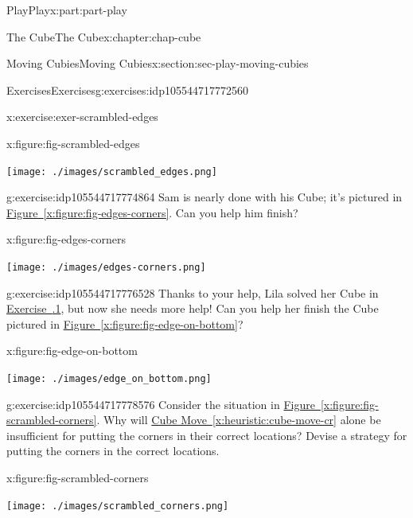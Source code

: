 \documentclass[oneside,10pt,]{book}
\newcommand{\xreffont}{\relax}
\numberwithin{equation}{section}
\begin{document}
\begin{partptx}{Play}{}{Play}{}{}{x:part:part-play}
\begin{chapterptx}{The Cube}{}{The Cube}{}{}{x:chapter:chap-cube}
\begin{sectionptx}{Moving Cubies}{}{Moving Cubies}{}{}{x:section:sec-play-moving-cubies}
\begin{exercises-subsection-numberless}{Exercises}{}{Exercises}{}{}{g:exercises:idp105544717772560}
\begin{divisionexercise}{1}{}{}{x:exercise:exer-scrambled-edges}
\begin{figureptx}{}{x:figure:fig-scrambled-edges}{}%
\begin{image}{0.25}{0.5}{0.25}%
\texttt{[image: ./images/scrambled\_edges.png]}
\end{image}%
\tcblower
\end{figureptx}%
\end{divisionexercise}%
\begin{divisionexercise}{2}{}{}{g:exercise:idp105544717774864}%
Sam is nearly done with his Cube; it's pictured in \hyperref[x:figure:fig-edges-corners]{Figure~{\xreffont\ref{x:figure:fig-edges-corners}}}. Can you help him finish?%
\begin{figureptx}{}{x:figure:fig-edges-corners}{}%
\begin{image}{0.25}{0.5}{0.25}%
\texttt{[image: ./images/edges-corners.png]}
\end{image}%
\tcblower
\end{figureptx}%
\end{divisionexercise}%
\begin{divisionexercise}{3}{}{}{g:exercise:idp105544717776528}%
Thanks to your help, Lila solved her Cube in \hyperlink{x:exercise:exer-scrambled-edges}{Exercise~{\xreffont 1.3.1}}, but now she needs more help! Can you help her finish the Cube pictured in \hyperref[x:figure:fig-edge-on-bottom]{Figure~{\xreffont\ref{x:figure:fig-edge-on-bottom}}}?%
\begin{figureptx}{}{x:figure:fig-edge-on-bottom}{}%
\begin{image}{0.25}{0.5}{0.25}%
\texttt{[image: ./images/edge\_on\_bottom.png]}
\end{image}%
\tcblower
\end{figureptx}%
\end{divisionexercise}%
\begin{divisionexercise}{4}{}{}{g:exercise:idp105544717778576}%
Consider the situation in \hyperref[x:figure:fig-scrambled-corners]{Figure~{\xreffont\ref{x:figure:fig-scrambled-corners}}}. Why will \hyperref[x:heuristic:cube-move-cr]{Cube Move~{\xreffont\ref{x:heuristic:cube-move-cr}}} alone be insufficient for putting the corners in their correct locations? Devise a strategy for putting the corners in the correct locations.%
\begin{figureptx}{}{x:figure:fig-scrambled-corners}{}%
\begin{image}{0.25}{0.5}{0.25}%
\texttt{[image: ./images/scrambled\_corners.png]}
\end{image}%
\tcblower
\end{figureptx}%

\end{divisionexercise}
\end{exercises-subsection-numberless}
\end{sectionptx}
\end{chapterptx}
\end{partptx}
\end{document}
